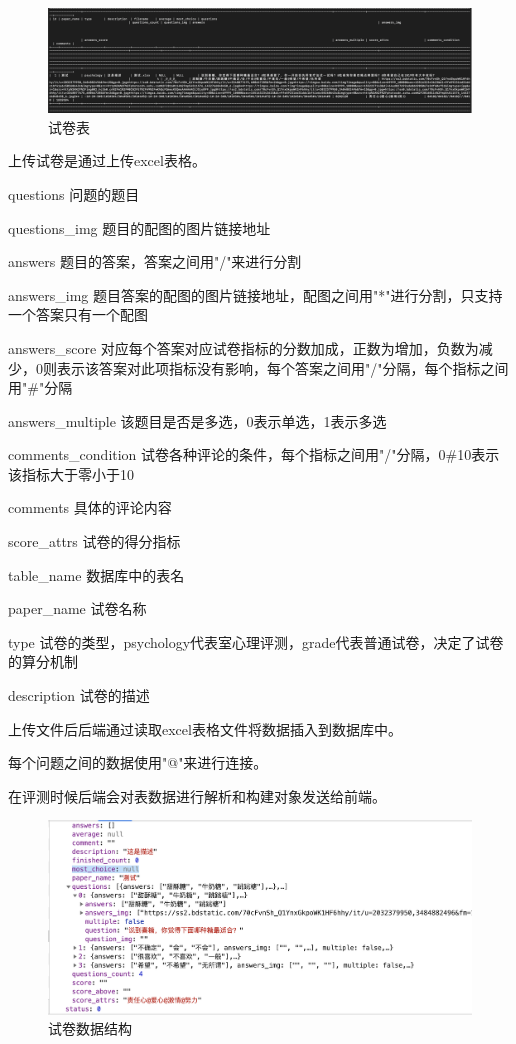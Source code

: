 \begin{figure}[thbp!]
	\centering
	\includegraphics[width=1.0\linewidth]{figure/paper_database}
	\caption{试卷表}
	\label{fig:paper_database}
\end{figure}

上传试卷是通过上传excel表格。

questions 问题的题目

questions\_img 题目的配图的图片链接地址

answers 题目的答案，答案之间用"/"来进行分割

answers\_img 题目答案的配图的图片链接地址，配图之间用"*"进行分割，只支持一个答案只有一个配图

answers\_score 对应每个答案对应试卷指标的分数加成，正数为增加，负数为减少，0则表示该答案对此项指标没有影响，每个答案之间用"/"分隔，每个指标之间用"\#"分隔

answers\_multiple 该题目是否是多选，0表示单选，1表示多选

comments\_condition 试卷各种评论的条件，每个指标之间用"/"分隔，0\#10表示该指标大于零小于10

comments 具体的评论内容

score\_attrs 试卷的得分指标

table\_name 数据库中的表名

paper\_name 试卷名称

type 试卷的类型，psychology代表室心理评测，grade代表普通试卷，决定了试卷的算分机制

description 试卷的描述

上传文件后后端通过读取excel表格文件将数据插入到数据库中。

每个问题之间的数据使用"@"来进行连接。

在评测时候后端会对表数据进行解析和构建对象发送给前端。

\begin{figure}[thbp!]
	\centering
	\includegraphics[width=1.0\linewidth]{figure/paper_data}
	\caption{试卷数据结构}
	\label{fig:paper_data}
\end{figure}


